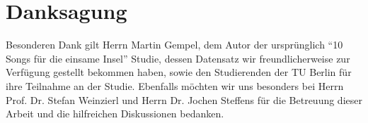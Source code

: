 \section*{Danksagung}
\label{sec:Danksagung}
Besonderen Dank gilt Herrn Martin Gempel, dem Autor der ursprünglich "`10 Songs für die einsame Insel"' Studie, dessen Datensatz wir freundlicherweise zur Verfügung gestellt bekommen haben, sowie den Studierenden der TU Berlin für ihre Teilnahme an der Studie.
Ebenfalls möchten wir uns besonders  bei Herrn Prof. Dr. Stefan Weinzierl und Herrn Dr. Jochen Steffens für die Betreuung dieser Arbeit und die hilfreichen Diskussionen bedanken.